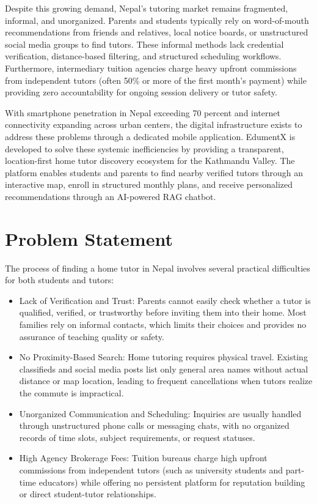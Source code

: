 \documentclass[12pt]{report}
\begin{document}
Despite this growing demand, Nepal's tutoring market remains fragmented, informal, and unorganized. Parents and students typically rely on word-of-mouth recommendations from friends and relatives, local notice boards, or unstructured social media groups to find tutors. These informal methods lack credential verification, distance-based filtering, and structured scheduling workflows. Furthermore, intermediary tuition agencies charge heavy upfront commissions from independent tutors (often 50\% or more of the first month's payment) while providing zero accountability for ongoing session delivery or tutor safety.

With smartphone penetration in Nepal exceeding 70 percent and internet connectivity expanding across urban centers, the digital infrastructure exists to address these problems through a dedicated mobile application. EdumentX is developed to solve these systemic inefficiencies by providing a transparent, location-first home tutor discovery ecosystem for the Kathmandu Valley. The platform enables students and parents to find nearby verified tutors through an interactive map, enroll in structured monthly plans, and receive personalized recommendations through an AI-powered RAG chatbot.

\section{Problem Statement}
The process of finding a home tutor in Nepal involves several practical difficulties for both students and tutors:
\begin{itemize}
\item Lack of Verification and Trust: Parents cannot easily check whether a tutor is qualified, verified, or trustworthy before inviting them into their home. Most families rely on informal contacts, which limits their choices and provides no assurance of teaching quality or safety.
\item No Proximity-Based Search: Home tutoring requires physical travel. Existing classifieds and social media posts list only general area names without actual distance or map location, leading to frequent cancellations when tutors realize the commute is impractical.
\item Unorganized Communication and Scheduling: Inquiries are usually handled through unstructured phone calls or messaging chats, with no organized records of time slots, subject requirements, or request statuses.
\item High Agency Brokerage Fees: Tuition bureaus charge high upfront commissions from independent tutors (such as university students and part-time educators) while offering no persistent platform for reputation building or direct student-tutor relationships.
\end{itemize}
\end{document}
